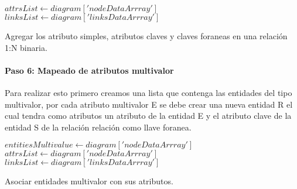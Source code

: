 \begin{algorithm}[H]

    $attrsList \gets diagram['nodeDataArrray']$
    $linksList \gets diagram['linksDataArrray']$
  \caption{Agregar los atributo simples, atributos claves y claves foraneas  en una relación 1:N binaria.}
\end{algorithm}

\paragraph*{Paso 6: Mapeado de atributos multivalor}

Para realizar esto primero creamos una lista que contenga las entidades del tipo multivalor, por cada atributo multivalor E se debe crear una nueva entidad R el cual tendra como atributos un atributo de la entidad E y el atributo clave de la entidad S de la relación relación como llave foranea.

\begin{algorithm}[H]

  $entitiesMultivalue \gets diagram['nodeDataArrray']$\\
  $attrsList \gets diagram['nodeDataArrray']$\\
  $linksList \gets diagram['linksDataArrray']$\\
   {
  }
  \caption{Asociar entidades multivalor con sus atributos.}
\end{algorithm}

